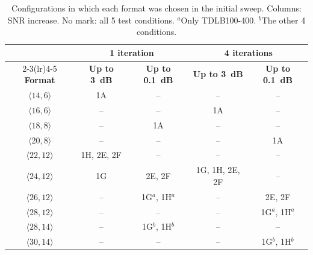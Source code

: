 \begin{table}[htbp]
\caption[Configurations in which each format was chosen in the initial sweep.]{Configurations in which each format was chosen in the initial sweep. Columns: SNR increase. No mark: all 5 test conditions. $^{a}$Only TDLB100-400. $^{b}$The other 4 conditions.}
\label{tab:formatos-origem}
\vspace{4pt} %
\centering
\footnotesize
\renewcommand{\arraystretch}{1.2}
\begin{tabular}{ccccc}
\toprule
 & \multicolumn{2}{c}{\textbf{1 iteration}} & \multicolumn{2}{c}{\textbf{4 iterations}} \\
\cmidrule(lr){2-3}\cmidrule(lr){4-5}
\textbf{Format} & \textbf{Up to 3~dB} & \textbf{Up to 0.1~dB} & \textbf{Up to 3~dB} & \textbf{Up to 0.1~dB} \\
\midrule
$\langle 14,6\rangle$  & 1A         & --                       & --             & --                       \\
$\langle 16,6\rangle$  & --         & --                       & 1A             & --                       \\
$\langle 18,8\rangle$  & --         & 1A                       & --             & --                       \\
$\langle 20,8\rangle$  & --         & --                       & --             & 1A                       \\
$\langle 22,12\rangle$ & 1H, 2E, 2F & --                       & --             & --                       \\
$\langle 24,12\rangle$ & 1G         & 2E, 2F                   & 1G, 1H, 2E, 2F & --                       \\
$\langle 26,12\rangle$ & --         & 1G$^{a}$, 1H$^{a}$       & --             & 2E, 2F                   \\
$\langle 28,12\rangle$ & --         & --                       & --             & 1G$^{a}$, 1H$^{a}$       \\
$\langle 28,14\rangle$ & --         & 1G$^{b}$, 1H$^{b}$       & --             & --                       \\
$\langle 30,14\rangle$ & --         & --                       & --             & 1G$^{b}$, 1H$^{b}$       \\
\bottomrule
\end{tabular}
\vspace{4pt}
\end{table}



